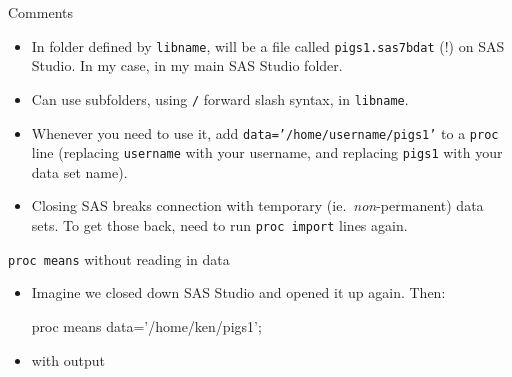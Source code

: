 \documentclass[unknownkeysallowed]{beamer}\usepackage[]{graphicx}\usepackage[]{color}
\begin{document}
\begin{frame}[fragile]{Comments}
  \begin{itemize}
  \item In folder defined by \texttt{libname}, will be a file called
    \texttt{pigs1.sas7bdat} (!) on SAS Studio. In my case, in my main
    SAS Studio folder.
\item Can use subfolders, using \texttt{/} forward slash syntax, in
  \texttt{libname}. 

\item Whenever you need to use it, add
  \texttt{data='/home/username/pigs1'} to a \texttt{proc} line
  (replacing \texttt{username} with your username, and replacing
  \texttt{pigs1} with your data set name).
\item Closing SAS breaks connection with temporary (ie.\
  \emph{non}-permanent) data sets. To get those back, need to run
  \texttt{proc import} lines again. 

  \end{itemize}
\end{frame}

\begin{frame}[fragile]{\texttt{proc means} without reading in data}
  
  \begin{itemize}
  \item Imagine we closed down SAS Studio and opened it up again. Then:
    
    \begin{Sascode}[store=md]
proc means data='/home/ken/pigs1';      
    \end{Sascode}
    
    
  \item with output
    
  \end{itemize}
  
\end{frame}
\end{document}

